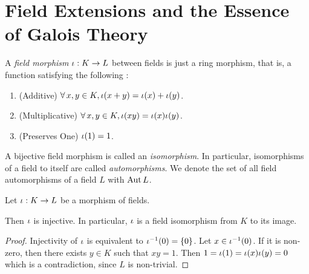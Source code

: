 \documentclass[main.tex]{subfiles}
\begin{document}
\section{Field Extensions and the Essence of Galois Theory}

\begin{dfn} 

  A \emph{field morphism} $\iota : K \to L$ between fields is
  just a ring morphism, that is, a function satisfying the following : 
  \begin{enumerate}
    \item (Additive)
    $\forall\, x, y \in K, \iota(x + y) = \iota(x) + \iota(y)$. 
    \item (Multiplicative) 
    $\forall\, x, y \in K, \iota(x y) = \iota(x) \iota(y)$. 
    \item (Preserves One) $\iota(1) = 1$.  
  \end{enumerate} 
  A bijective field morphism is called an \emph{isomorphism}. 
  In particular, 
  isomorphisms of a field to itself are called \emph{automorphisms}. 
  We denote the set of all field automorphisms of a field $L$ 
  with $\operatorname{Aut} L$. 
\end{dfn}

\begin{thm}
  
  Let $\iota : K \to L$ be a morphism of fields. 

  Then $\iota$ is injective. 
  In particular, $\iota$ is a field isomorphism from $K$ to its image. 
\end{thm}
\begin{proof}
  Injectivity of $\iota$ is equivalent to $\iota^{-1}(0) = \{0\}$. 
  Let $x \in \iota^{-1}(0)$.
  If it is non-zero, then there exists $y \in K$ such that $x y = 1$. 
  Then $1 = \iota(1) = \iota(x) \iota(y) = 0$
  which is a contradiction, since $L$ is non-trivial. 
\end{proof}
\end{document}
